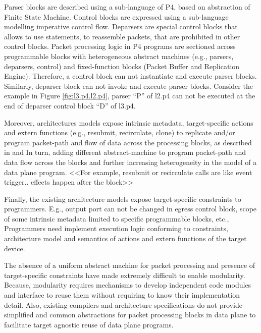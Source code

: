 \documentclass{hotnets19}
\begin{document}
Parser blocks are described using a sub-language of P4, based on abstraction of Finite State Machine.
Control blocks are expressed using a sub-language modelling imperative control flow.
Deparsers are special control blocks that allows to use statements, to reassemble packets, that are prohibited in other control blocks.
Packet processing logic in P4 programs are sectioned across programmable blocks with heterogeneous abstract machines (e.g., parsers, deparsers, control) and fixed-function blocks (Packet Buffer and Replication Engine).
Therefore, a control block can not instantiate and execute parser blocks. Similarly, deparser block can not invoke and execute parser blocks.  
Consider the example in Figure \ref{fig:l3.p4.l2.p4}, parser ``P'' of l2.p4 can not be executed at the end of deparser control block ``D'' of l3.p4.


Moreover, architectures models expose intrinsic metadata, target-specific actions and extern functions (e.g., resubmit, recirculate, clone) to replicate and/or program packet-path and flow of data across the processing blocks, as described in \cite{simple_switch.md} and  \cite{psa}
In turn, adding different abstract-machine to program packet-path and data flow across the blocks and further increasing heterogeneity in the model of a data plane program.
<<For example, resubmit or recirculate calls are like event trigger.. effects happen after the block>>

Finally, the existing architecture models expose target-spe\-cific constraints to programmers.
E.g., output port can not be changed in egress control block, scope of some intrinsic metadata limited to specific programmable blocks, etc.,  
Programmers need implement execution logic conforming to constraints, architecture model and semantics of actions and extern functions of the target device.



The absence of a uniform abstract machine for packet processing and presence of target-specific constraints have made extremely difficult to enable modularity.
Because, modularity requires mechanisms to develop independent code modules and interface to reuse them without requiring to know their implementation detail.
Also, existing compilers and architecture specifications do not provide simplified and common abstractions for packet processing blocks in data plane to facilitate target agnostic reuse of data plane programs.
\end{document}
